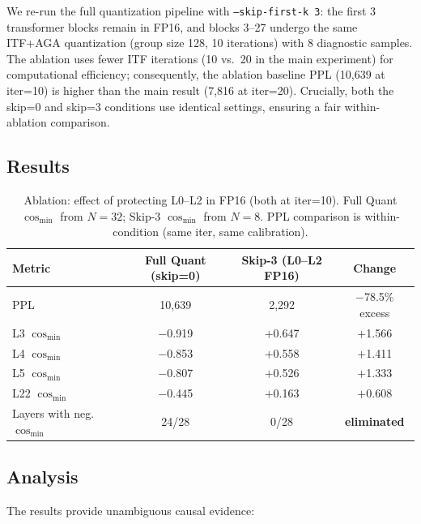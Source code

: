\documentclass[10pt,a4paper]{article}
\begin{document}
We re-run the full quantization pipeline with \texttt{--skip-first-k 3}: the first 3 transformer blocks remain in FP16, and blocks 3--27 undergo the same ITF+AGA quantization (group size 128, 10 iterations) with 8 diagnostic samples.
The ablation uses fewer ITF iterations (10 vs.\ 20 in the main experiment) for computational efficiency; consequently, the ablation baseline PPL (10,639 at iter=10) is higher than the main result (7,816 at iter=20).
Crucially, both the skip=0 and skip=3 conditions use identical settings, ensuring a fair within-ablation comparison.

\subsection{Results}

\begin{table}[htbp]
\centering
\caption{Ablation: effect of protecting L0--L2 in FP16 (both at iter=10). Full Quant $\cos_{\min}$ from $N{=}32$; Skip-3 $\cos_{\min}$ from $N{=}8$. PPL comparison is within-condition (same iter, same calibration).}
\label{tab:ablation}
\begin{tabular}{lccc}
\toprule
\textbf{Metric} & \textbf{Full Quant (skip=0)} & \textbf{Skip-3 (L0--L2 FP16)} & \textbf{Change} \\
\midrule
PPL & 10,639 & 2,292 & $-$78.5\% excess \\
L3 $\cos_{\min}$ & $-$0.919 & $+$0.647 & $+$1.566 \\
L4 $\cos_{\min}$ & $-$0.853 & $+$0.558 & $+$1.411 \\
L5 $\cos_{\min}$ & $-$0.807 & $+$0.526 & $+$1.333 \\
L22 $\cos_{\min}$ & $-$0.445 & $+$0.163 & $+$0.608 \\
Layers with neg.\ $\cos_{\min}$ & 24/28 & 0/28 & \textbf{eliminated} \\
\bottomrule
\end{tabular}
\end{table}

\subsection{Analysis}

The results provide unambiguous causal evidence:
\end{document}
